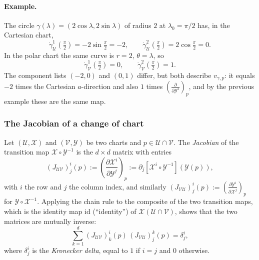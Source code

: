 \documentclass[11pt]{article}
\begin{document}
\paragraph{Example.} The circle $\gamma(\lambda)=(2\cos\lambda,2\sin\lambda)$ of radius $2$ at $\lambda_0=\pi/2$ has, in the Cartesian chart,
\[
\dot\gamma^1_{\mathcal U}(\tfrac\pi2)=-2\sin\tfrac\pi2=-2,\qquad\dot\gamma^2_{\mathcal U}(\tfrac\pi2)=2\cos\tfrac\pi2=0.
\]
In the polar chart the same curve is $r=2$, $\theta=\lambda$, so
\[
\dot\gamma^1_{\mathcal V}(\tfrac\pi2)=0,\qquad\dot\gamma^2_{\mathcal V}(\tfrac\pi2)=1.
\]
The component lists $(-2,0)$ and $(0,1)$ differ, but both describe $v_{\gamma,p}$: it equals $-2$ times the Cartesian $a$-direction and also $1$ times $\left(\frac{\partial}{\partial\mathcal Y^2}\right)_p$, and by the previous example these are the same map.

\subsubsection*{The Jacobian of a change of chart}
Let $(\mathcal U,\mathcal X)$ and $(\mathcal V,\mathcal Y)$ be two charts and $p\in\mathcal U\cap\mathcal V$. The \emph{Jacobian} of the transition map $\mathcal X\circ\mathcal Y^{-1}$ is the $d\times d$ matrix with entries
\[
(J_{\mathcal{UV}})^i_j(p):=\left(\frac{\partial\mathcal X^i}{\partial\mathcal Y^j}\right)_p:=\partial_j[\mathcal X^i\circ\mathcal Y^{-1}](\mathcal Y(p)),
\]
with $i$ the row and $j$ the column index, and similarly $(J_{\mathcal{VU}})^i_j(p):=\left(\frac{\partial\mathcal Y^i}{\partial\mathcal X^j}\right)_p$ for $\mathcal Y\circ\mathcal X^{-1}$. Applying the chain rule to the composite of the two transition maps, which is the identity map $\mathrm{id}$ (``identity'') of $\mathcal X(\mathcal U\cap\mathcal V)$, shows that the two matrices are mutually inverse:
\begin{equation}
\sum_{k=1}^d(J_{\mathcal{UV}})^i_k(p)\,(J_{\mathcal{VU}})^k_j(p)=\delta^i_j,
\tag{4.1}\label{eq:4-jac-inverse}
\end{equation}
where $\delta^i_j$ is the \emph{Kronecker delta}, equal to $1$ if $i=j$ and $0$ otherwise.
\end{document}
